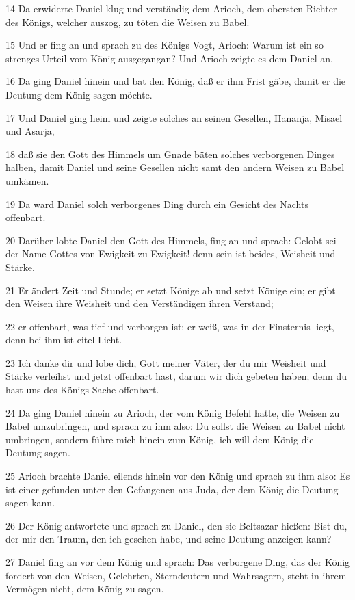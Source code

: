 \par 14 Da erwiderte Daniel klug und verständig dem Arioch, dem obersten Richter des Königs, welcher auszog, zu töten die Weisen zu Babel.
\par 15 Und er fing an und sprach zu des Königs Vogt, Arioch: Warum ist ein so strenges Urteil vom König ausgegangan? Und Arioch zeigte es dem Daniel an.
\par 16 Da ging Daniel hinein und bat den König, daß er ihm Frist gäbe, damit er die Deutung dem König sagen möchte.
\par 17 Und Daniel ging heim und zeigte solches an seinen Gesellen, Hananja, Misael und Asarja,
\par 18 daß sie den Gott des Himmels um Gnade bäten solches verborgenen Dinges halben, damit Daniel und seine Gesellen nicht samt den andern Weisen zu Babel umkämen.
\par 19 Da ward Daniel solch verborgenes Ding durch ein Gesicht des Nachts offenbart.
\par 20 Darüber lobte Daniel den Gott des Himmels, fing an und sprach: Gelobt sei der Name Gottes von Ewigkeit zu Ewigkeit! denn sein ist beides, Weisheit und Stärke.
\par 21 Er ändert Zeit und Stunde; er setzt Könige ab und setzt Könige ein; er gibt den Weisen ihre Weisheit und den Verständigen ihren Verstand;
\par 22 er offenbart, was tief und verborgen ist; er weiß, was in der Finsternis liegt, denn bei ihm ist eitel Licht.
\par 23 Ich danke dir und lobe dich, Gott meiner Väter, der du mir Weisheit und Stärke verleihst und jetzt offenbart hast, darum wir dich gebeten haben; denn du hast uns des Königs Sache offenbart.
\par 24 Da ging Daniel hinein zu Arioch, der vom König Befehl hatte, die Weisen zu Babel umzubringen, und sprach zu ihm also: Du sollst die Weisen zu Babel nicht umbringen, sondern führe mich hinein zum König, ich will dem König die Deutung sagen.
\par 25 Arioch brachte Daniel eilends hinein vor den König und sprach zu ihm also: Es ist einer gefunden unter den Gefangenen aus Juda, der dem König die Deutung sagen kann.
\par 26 Der König antwortete und sprach zu Daniel, den sie Beltsazar hießen: Bist du, der mir den Traum, den ich gesehen habe, und seine Deutung anzeigen kann?
\par 27 Daniel fing an vor dem König und sprach: Das verborgene Ding, das der König fordert von den Weisen, Gelehrten, Sterndeutern und Wahrsagern, steht in ihrem Vermögen nicht, dem König zu sagen.
